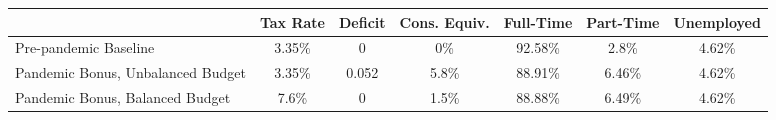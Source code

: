 \begin{center}
\begin{adjustbox}{width=\textwidth}
\begin{tabular}{lcccccc}\toprule
 & Tax Rate & Deficit & Cons. Equiv. & Full-Time & Part-Time & Unemployed \\
\midrule
Pre-pandemic Baseline & 3.35\% & 0 & 0\% & 92.58\% & 2.8\% & 4.62\% \\
Pandemic Bonus, Unbalanced Budget & 3.35\% & 0.052 & 5.8\% & 88.91\% & 6.46\% & 4.62\% \\
Pandemic Bonus, Balanced Budget & 7.6\% & 0 & 1.5\% & 88.88\% & 6.49\% & 4.62\% \\
\bottomrule\end{tabular}
\end{adjustbox}
\end{center}
